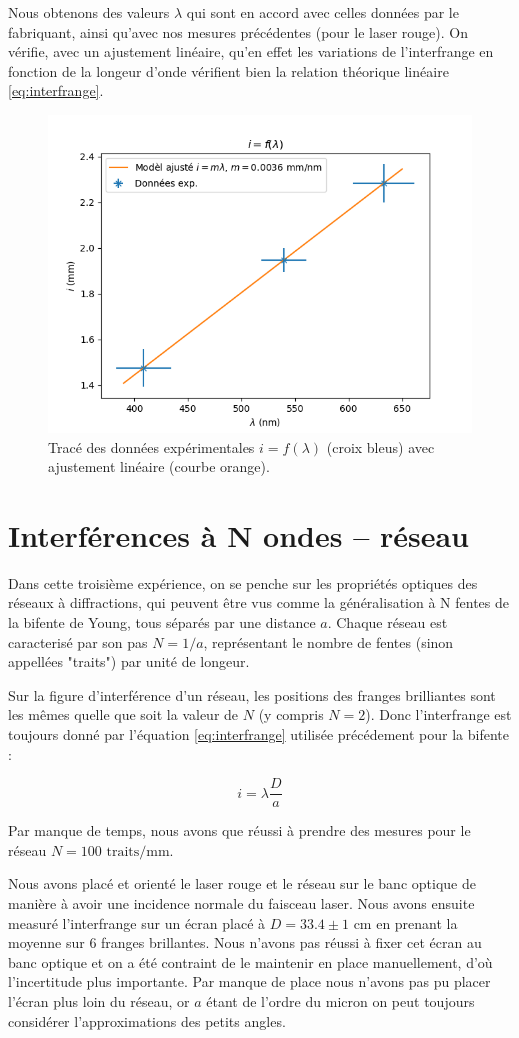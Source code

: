 \documentclass{article}
\begin{document}
Nous obtenons des valeurs $\lambda$ qui sont en accord avec celles données par le fabriquant, ainsi qu'avec nos mesures précédentes (pour le laser rouge). 
On vérifie, avec un ajustement linéaire, qu'en effet les variations de l'interfrange en fonction de la longeur d'onde vérifient bien la relation théorique linéaire \eqref{eq:interfrange}.

\begin{figure}[H]
    \centering
    \includegraphics[width=0.6\linewidth]{figs/i=f(lambda).png}
    \caption{Tracé des données expérimentales $i=f(\lambda)$ (croix bleus) avec ajustement linéaire (courbe orange).}
    \label{fig:verif_lambda}
\end{figure}

\section{Interférences à N ondes – réseau}

Dans cette troisième expérience, on se penche sur les propriétés optiques des réseaux à diffractions, qui peuvent 
être vus comme la généralisation à N fentes de la bifente de Young, tous séparés par une distance $a$. Chaque réseau 
est caracterisé par son pas $N = 1/a$, représentant le nombre de fentes (sinon appellées "traits") par unité de longeur.

Sur la figure d'interférence d'un réseau, les positions des franges brilliantes sont les mêmes quelle que soit la valeur de $N$ (y compris $N=2$).
Donc l'interfrange est toujours donné par l'équation \eqref{eq:interfrange} utilisée précédement pour la bifente :

$$i = \lambda \frac{D}{a}$$

Par manque de temps, nous avons que réussi à prendre des mesures pour le réseau $N=100 \textrm{ traits/mm}$. 

Nous avons placé et orienté le laser rouge et le réseau sur le banc optique de manière à avoir une incidence normale 
du faisceau laser. Nous avons ensuite measuré l'interfrange sur un écran placé à $D = 33.4 \pm 1 \textrm{ cm}$ en prenant la moyenne sur 6 franges brillantes. 
Nous n'avons pas réussi à fixer cet écran au banc optique et on a été contraint de le maintenir en place manuellement, d'où l'incertitude plus
importante. Par manque de place nous n'avons pas pu placer l'écran plus loin du réseau, or $a$ étant de l'ordre du micron on peut toujours 
considérer l'approximations des petits angles.
\end{document}
